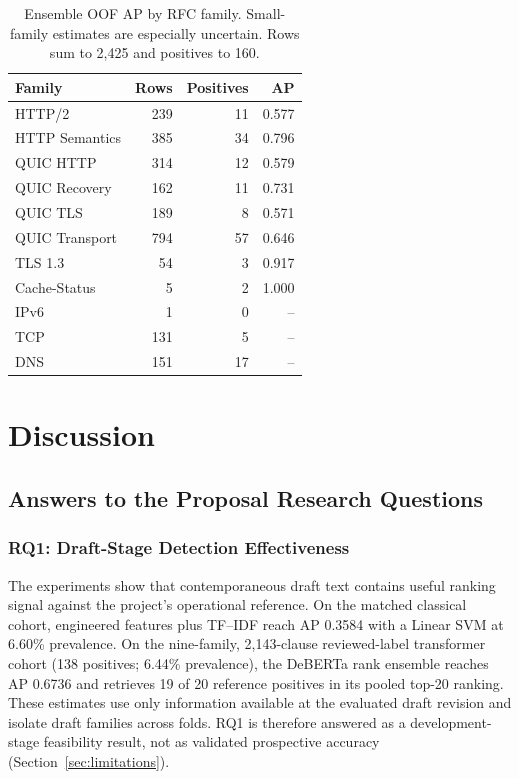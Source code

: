 \documentclass[12pt,a4paper,oneside]{report}
\begin{document}
\begin{table}[!tbp]
\caption{Ensemble OOF AP by RFC family. Small-family estimates are especially uncertain. Rows sum to 2,425 and positives to 160.}
\label{tab:family-ap}
\centering
\begin{tabular}{lrrr}
\toprule
Family & Rows & Positives & AP \\
\midrule
HTTP/2 & 239 & 11 & 0.577 \\
HTTP Semantics & 385 & 34 & 0.796 \\
QUIC HTTP & 314 & 12 & 0.579 \\
QUIC Recovery & 162 & 11 & 0.731 \\
QUIC TLS & 189 & 8 & 0.571 \\
QUIC Transport & 794 & 57 & 0.646 \\
TLS 1.3 & 54 & 3 & 0.917 \\
Cache-Status & 5 & 2 & 1.000 \\
IPv6 & 1 & 0 & -- \\
TCP  & 131 &  5 & -- \\
DNS  & 151 & 17 & -- \\
\bottomrule
\end{tabular}
\end{table}

\chapter{Discussion}

\section{Answers to the Proposal Research Questions}

\subsection{RQ1: Draft-Stage Detection Effectiveness}

The experiments show that contemporaneous draft text contains useful ranking signal against the project's operational reference. On the matched classical cohort, engineered features plus TF--IDF reach AP 0.3584 with a Linear SVM at 6.60\% prevalence. On the nine-family, 2,143-clause reviewed-label transformer cohort (138 positives; 6.44\% prevalence), the DeBERTa rank ensemble reaches AP 0.6736 and retrieves 19 of 20 reference positives in its pooled top-20 ranking. These estimates use only information available at the evaluated draft revision and isolate draft families across folds. RQ1 is therefore answered as a development-stage feasibility result, not as validated prospective accuracy (Section~\ref{sec:limitations}).
\end{document}
